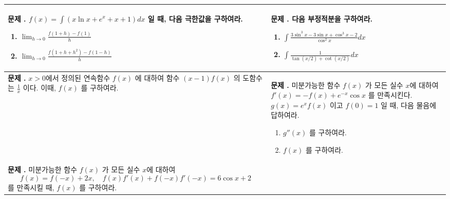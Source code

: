 \documentclass[10pt, a4paper]{article} %
\newcounter{probcount}
\newcommand{\exercise}[1]{%
    \stepcounter{probcount}%
    \begin{minipage}[t][110mm][t]{0.44\textwidth}
        \small %
        \vspace{1mm}
        \noindent \textbf{문제 \arabic{probcount}.} #1
    \end{minipage}%
}
\begin{document}
\noindent
\begin{longtable}{p{} | p{}}
    
    \exercise{$f(x)=\int(x \ln x+e^{x}+x+1)dx$ 일 때, 다음 극한값을 구하여라.
    \begin{enumerate}[label=(\arabic*)]
        \item $\displaystyle \lim_{h\rightarrow0}\frac{f(1+h)-f(1)}{h}$
        \item $\displaystyle \lim_{h\rightarrow0}\frac{f(1+h+h^{2})-f(1-h)}{h}$
    \end{enumerate}}
    & 
    \exercise{다음 부정적분을 구하여라.
    \begin{enumerate}[label=(\arabic*)]
        \item $\displaystyle \int\frac{3 \sin^{3}x-3 \sin x+\cos^{3}x-2}{\cos^{2}x}dx$
        \item $\displaystyle \int\frac{1}{\tan(x/2)+\cot(x/2)}dx$
    \end{enumerate}}\\
    \hline

    \exercise{$x>0$에서 정의된 연속함수 $f(x)$ 에 대하여 함수 $(x-1)f(x)$ 의 도함수는 $\frac{1}{x}$ 이다. 이때, $f(x)$ 를 구하여라.}
    & 
    \exercise{미분가능한 함수 $f(x)$ 가 모든 실수 $x$에 대하여 $f'(x)=-f(x)+e^{-x}\cos x$ 를 만족시킨다. $g(x)=e^{x}f(x)$ 이고 $f(0)=1$ 일 때, 다음 물음에 답하여라.
    \begin{enumerate}[label=(\arabic*)]
    \item $g''(x)$ 를 구하여라.
    \item $f(x)$ 를 구하여라.
    \end{enumerate}} \\
 
    
    \exercise{미분가능한 함수 $f(x)$ 가 모든 실수 $x$에 대하여 
    \[ f(x)=f(-x)+2x, \quad f(x)f'(x)+f(-x)f'(-x)=6 \cos x+2 \]
    를 만족시킬 때, $f(x)$ 를 구하여라.}
    & \\
    
   
\end{longtable}
\end{document}
